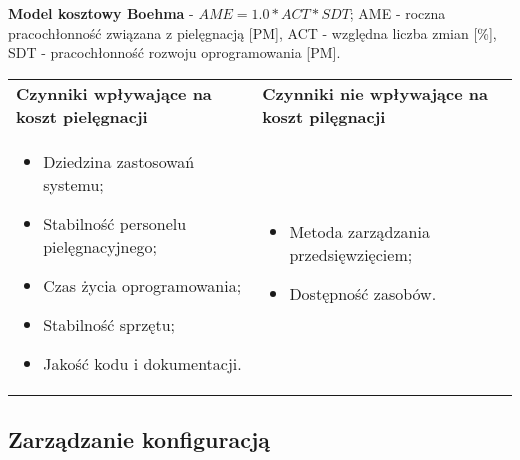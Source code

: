 \documentclass[../main.tex]{subfiles}
\begin{document}
    \textbf{Model kosztowy Boehma} - $AME = 1.0 * ACT * SDT$; AME - roczna pracochłonność związana
    z pielęgnacją [PM], ACT - względna liczba zmian [\%], SDT - pracochłonność rozwoju oprogramowania [PM].


    \begin{table}[H]
        \begin{center}
            \begin{tabular}{p{.5\linewidth} p{.5\linewidth}}
                \textbf{Czynniki wpływające na koszt pielęgnacji} & \textbf{Czynniki nie wpływające na koszt pilęgnacji} \\

                \begin{itemize}
                    \item  Dziedzina zastosowań systemu;
                    \item Stabilność personelu pielęgnacyjnego;
                    \item Czas życia oprogramowania;
                    \item Stabilność sprzętu;
                    \item Jakość kodu i dokumentacji.
                \end{itemize}
                &
                \begin{itemize}
                    \item Metoda zarządzania przedsięwzięciem;
                    \item Dostępność zasobów.
                \end{itemize}
            \end{tabular}
        \end{center}
    \end{table}

    \subsection{Zarządzanie konfiguracją}
\end{document}
